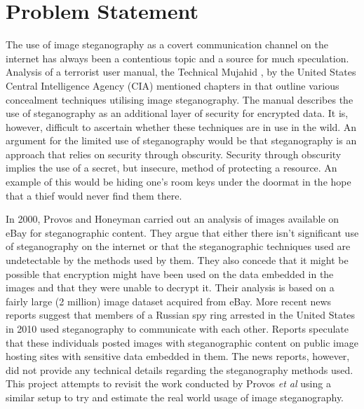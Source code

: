 \section{Problem Statement}
\label{sec:probstatement}
\par The use of image steganography as a covert communication channel on the internet has always been a contentious topic and a source for much speculation. Analysis of a terrorist user manual, the Technical Mujahid \cite{alfajr}, by the United States Central Intelligence Agency (CIA) mentioned chapters in that outline various concealment techniques utilising image steganography. The manual describes the use of steganography as an additional layer of security for encrypted data. It is, however, difficult to ascertain whether these techniques are in use in the wild. An argument for the limited use of steganography would be that steganography is an approach that relies on security through obscurity. Security through obscurity implies the use of a secret, but insecure, method of protecting a resource. An example of this would be hiding one's room keys under the doormat in the hope that a thief would never find them there. 
\par In 2000, Provos and Honeyman \cite{provos2001detecting}  carried out an analysis of images available on eBay for steganographic content.  They argue that either there isn't  significant use of steganography on the internet or that the steganographic techniques used are undetectable by the methods used by them. They also concede that it might be possible that encryption might have been used on the data embedded in the images and that they were unable to decrypt it. Their analysis is based on a fairly large (2 million) image dataset acquired from eBay.   More recent news reports  \cite{spies2010} suggest that members of a Russian spy ring arrested in the United States in 2010 used steganography to communicate with each other. Reports speculate that these individuals posted images with steganographic content on public image hosting sites with sensitive data embedded in them. The news reports, however, did not provide any technical details regarding the steganography methods used. This project attempts to revisit the work conducted by Provos \emph{et al} using a similar setup to try and estimate the real world usage of image steganography.


